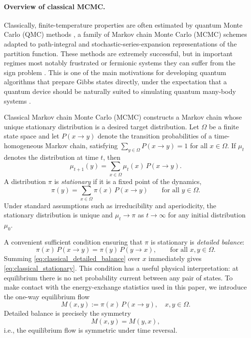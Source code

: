 \documentclass[showpacs,amsmath,amssymb,twocolumn,prx,superscriptaddress,10pt,aps,nofootinbib]{revtex4-2}
\begin{document}
\paragraph{Overview of classical MCMC.}
\label{subsec:classical_mcmc}

Classically, finite-temperature properties are often estimated by quantum Monte Carlo (QMC) methods \cite{foulkes2001quantum}, a family of Markov chain Monte Carlo (MCMC) schemes \cite{metropolis1953equation,levin2017markov,robert1999monte} adapted to path-integral and stochastic-series-expansion representations of the partition function. These methods are extremely successful, but in important regimes most notably frustrated or fermionic systems they can suffer from the sign problem \cite{Henelius2000,pan2022sign}. This is one of the main motivations for developing quantum algorithms that prepare Gibbs states directly, under the expectation that a quantum device should be naturally suited to simulating quantum many-body systems \cite{feynman1982simulating}.

Classical Markov chain Monte Carlo (MCMC) constructs a Markov chain whose unique stationary distribution is a desired target distribution. Let $\Omega$ be a finite state space and let $P(x\to y)$ denote the transition probabilities of a time-homogeneous Markov chain, satisfying $\sum_{y\in\Omega}P(x\to y)=1$ for all $x\in\Omega$. If $\mu_t$ denotes the distribution at time $t$, then
\begin{equation}
\label{eq:classical_markov_update}
    \mu_{t+1}(y)=\sum_{x\in\Omega}\mu_t(x)\,P(x\to y).
\end{equation}
A distribution $\pi$ is \emph{stationary} if it is a fixed point of the dynamics,
\begin{equation}
\label{eq:classical_stationary}
    \pi(y)=\sum_{x\in\Omega}\pi(x)\,P(x\to y)
    \qquad \text{for all } y\in\Omega.
\end{equation}
Under standard assumptions such as irreducibility and aperiodicity, the stationary distribution is unique and $\mu_t\to\pi$ as $t\to\infty$ for any initial distribution $\mu_0$.

A convenient sufficient condition ensuring that $\pi$ is stationary is \emph{detailed balance}:
\begin{equation}
\label{eq:classical_detailed_balance}
    \pi(x)\,P(x\to y)=\pi(y)\,P(y\to x),
    \qquad \text{for all } x,y\in\Omega.
\end{equation}
Summing \eqref{eq:classical_detailed_balance} over $x$ immediately gives \eqref{eq:classical_stationary}. This condition has a useful physical interpretation: at equilibrium there is no net probability current between any pair of states. To make contact with the energy-exchange statistics used in this paper, we introduce the one-way equilibrium flow
\begin{equation}
\label{eq:classical_oneway_flow}
    M(x,y):=\pi(x)\,P(x\to y),\quad x,y \in \Omega.
\end{equation}
Detailed balance is precisely the symmetry
\begin{equation}
\label{eq:classical_flow_symmetry}
    M(x,y)=M(y,x),
\end{equation}
i.e., the equilibrium flow is symmetric under time reversal.
\end{document}
